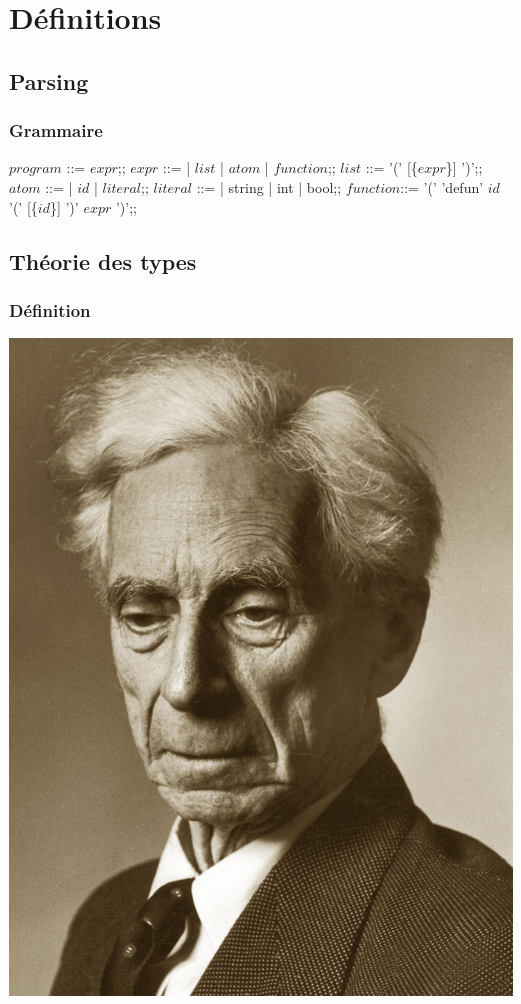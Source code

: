 \documentclass{beamer}
\begin{document}
\section{Définitions}
\subsection{Parsing}
\begin{frame}
		\frametitle{Grammaire}
		\begin{bnf}
				$program$ ::= $expr$;;
				$expr$    ::= | $list$ | $atom$ | $function$;;
				$list$    ::= '(' [\{$expr$\}] ')';;
				$atom$    ::= | $id$ | $literal$;;
				$literal$ ::= | string | int | bool;;
				$function$::= '(' 'defun' $id$ '(' [\{$id$\}] ')' $expr$ ')';;
		\end{bnf} 
\end{frame}

\subsection{Théorie des types}
\begin{frame}
		\frametitle{Définition}
		\begin{center}
				\includegraphics[scale=0.125]{russell}
		\end{center}
\end{frame}
\end{document}
